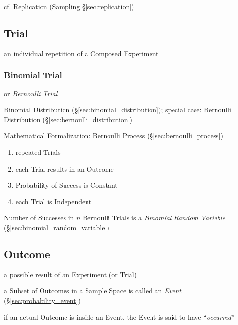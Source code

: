 \fist cf. Replication (Sampling \S\ref{sec:replication})



\subsection{Trial}\label{sec:trial}

an individual repetition of a Composed Experiment



\subsubsection{Binomial Trial}\label{sec:binomial_trial}

or \emph{Bernoulli Trial}

Binomial Distribution (\S\ref{sec:binomial_distribution}); special case:
Bernoulli Distribution (\S\ref{sec:bernoulli_distribution})

Mathematical Formalization: Bernoulli Process (\S\ref{sec:bernoulli_process})

\begin{enumerate}
  \item repeated Trials
  \item each Trial results in an Outcome
  \item Probability of Success is Constant
  \item each Trial is Independent
\end{enumerate}

Number of Successes in $n$ Bernoulli Trials is a \emph{Binomial Random
  Variable} (\S\ref{sec:binomial_random_variable})



\subsection{Outcome}\label{sec:outcome}

a possible result of an Experiment (or Trial)

a Subset of Outcomes in a Sample Space is called an \emph{Event}
(\S\ref{sec:probability_event})

if an actual Outcome is inside an Event, the Event is said to have
``\emph{occurred}''

